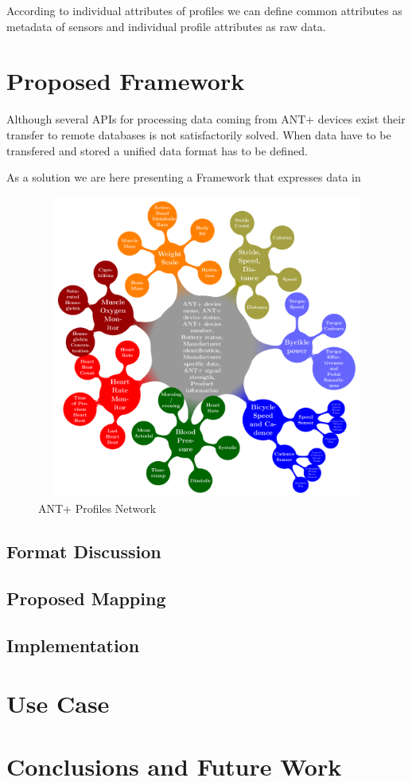 \documentclass[conference]{IEEEconf}
\begin{document}
According to individual attributes of profiles we can define common attributes as metadata of sensors and individual profile attributes as raw data. 

\section{Proposed Framework}\label{sec:framework}

Although several APIs for processing data coming from ANT+ devices exist their transfer to remote databases is not satisfactorily solved. When data have to be transfered and stored a unified data format has to be defined.

As a solution we are here presenting a Framework that expresses data in 

\begin{figure}[ht]
\centering\includegraphics[width=12cm, height=10cm]{AntPlusProfiles}
\caption{\label{AntPlus}ANT+ Profiles Network}
\end{figure}

\subsection{Format Discussion}
\subsection{Proposed Mapping}
\subsection{Implementation}

\section{Use Case}\label{sec:use-case}

\section{Conclusions and Future Work}\label{sec:future-work}








\end{document}
